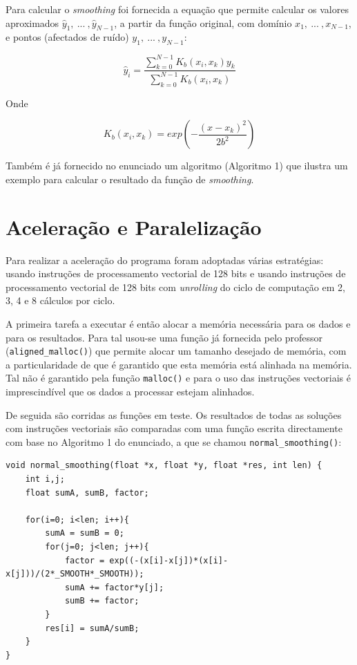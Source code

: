 \documentclass[a4paper]{article}
\begin{document}
	Para calcular o \textit{smoothing} foi fornecida a equação que permite calcular os valores aproximados $\hat{y}_1,\ ...\ , \hat{y}_{N-1}$, a partir da função original, com domínio $x_1,\ ...\ ,x_{N-1}$, e pontos (afectados de ruído) $y_1,\ ...\ , y_{N-1}$:
	
	\begin{equation}
		\hat{y}_i =  \frac{ \sum_{k=0}^{N-1} K_b (x_i, x_k ) y_k}{\sum_{k=0}^{N-1} K_b (x_i, x_k )} 
		\label{eq:smoothing_function}
	\end{equation}
	
	Onde
	
	\begin{equation}
		K_b (x_i,x_k)=exp\left(-\frac{(x-x_k)^2}{2b^2} \right)
		\label{eq:smoothing_kb}
	\end{equation}
	 	
	 	 
	Também é já fornecido no enunciado um algoritmo (Algoritmo 1) que ilustra um exemplo para calcular o resultado da função de \textit{smoothing}.
	
	
	\section{Aceleração e Paralelização}
	
	Para realizar a aceleração do programa foram adoptadas várias estratégias: usando instruções de processamento vectorial de 128 bits e usando instruções de processamento vectorial de 128 bits com \textit{unrolling} do ciclo de computação em 2, 3, 4 e 8 cálculos por ciclo.
	
	A primeira tarefa a executar é então alocar a memória necessária para os dados e para os resultados. Para tal usou-se uma função já fornecida pelo professor (\texttt{aligned\_malloc()}) que permite alocar um tamanho desejado de memória, com a particularidade de que é garantido que esta memória está alinhada na memória. Tal não é garantido pela função \texttt{malloc()} e para o uso das instruções vectoriais é imprescindível que os dados a processar estejam alinhados.
	
	De seguida são corridas as funções em teste. Os resultados de todas as soluções com instruções vectoriais são comparadas com uma função escrita directamente com base no Algoritmo 1 do enunciado, a que se chamou \texttt{normal\_smoothing()}:
	
	\begin{verbatim}
void normal_smoothing(float *x, float *y, float *res, int len) {
    int i,j;
    float sumA, sumB, factor;
    
    for(i=0; i<len; i++){
        sumA = sumB = 0;
        for(j=0; j<len; j++){
            factor = exp((-(x[i]-x[j])*(x[i]-x[j]))/(2*_SMOOTH*_SMOOTH));
            sumA += factor*y[j];
            sumB += factor;
        }
        res[i] = sumA/sumB;
    }
}
	\end{verbatim}
	
\end{document}

